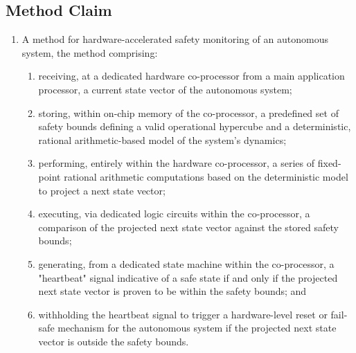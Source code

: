 \documentclass{article}
\begin{document}
\subsection*{Method Claim}
\begin{enumerate}
    \item A method for hardware-accelerated safety monitoring of an autonomous system, the method comprising:
    \begin{enumerate}
        \item receiving, at a dedicated hardware co-processor from a main application processor, a current state vector of the autonomous system;
        \item storing, within on-chip memory of the co-processor, a predefined set of safety bounds defining a valid operational hypercube and a deterministic, rational arithmetic-based model of the system's dynamics;
        \item performing, entirely within the hardware co-processor, a series of fixed-point rational arithmetic computations based on the deterministic model to project a next state vector;
        \item executing, via dedicated logic circuits within the co-processor, a comparison of the projected next state vector against the stored safety bounds;
        \item generating, from a dedicated state machine within the co-processor, a "heartbeat" signal indicative of a safe state if and only if the projected next state vector is proven to be within the safety bounds; and
        \item withholding the heartbeat signal to trigger a hardware-level reset or fail-safe mechanism for the autonomous system if the projected next state vector is outside the safety bounds.
    \end{enumerate}
\end{enumerate}
\end{document}
